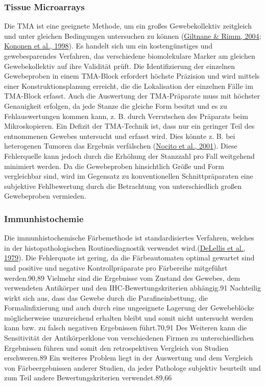 \hypertarget{tissue-microarrays}{%
\subsubsection{Tissue Microarrays}\label{tissue-microarrays}}

Die TMA ist eine geeignete Methode, um ein großes Gewebekollektiv zeitgleich und unter gleichen Bedingungen untersuchen zu können (\href{about:blank\#_ENREF_36}{Giltnane \& Rimm, 2004}; \href{about:blank\#_ENREF_46}{Kononen et al., 1998}). Es handelt sich um ein kostengünstiges und gewebesparendes Verfahren, das verschiedene biomolekulare Marker am gleichen Gewebekollektiv auf ihre Validität prüft. Die Identifizierung der einzelnen Gewebeproben in einem TMA-Block erfordert höchste Präzision und wird mittels einer Konstruktionsplanung erreicht, die die Lokalisation der einzelnen Fälle im TMA-Block erfasst. Auch die Auswertung der TMA-Präparate muss mit höchster Genauigkeit erfolgen, da jede Stanze die gleiche Form besitzt und es zu Fehlauswertungen kommen kann, z. B. durch Verrutschen des Präparats beim Mikroskopieren. Ein Defizit der TMA-Technik ist, dass nur ein geringer Teil des entnommenen Gewebes untersucht und erfasst wird. Dies könnte z. B. bei heterogenen Tumoren das Ergebnis verfälschen (\href{about:blank\#_ENREF_56}{Nocito et al., 2001}). Diese Fehlerquelle kann jedoch durch die Erhöhung der Stanzzahl pro Fall weitgehend minimiert werden. Da die Gewebeproben hinsichtlich Größe und Form vergleichbar sind, wird im Gegensatz zu konventionellen Schnittpräparaten eine subjektive Fehlbewertung durch die Betrachtung von unterschiedlich großen Gewebeproben vermieden.

\hypertarget{immunhistochemie}{%
\subsubsection{Immunhistochemie}\label{immunhistochemie}}

Die immunhistochemische Färbemethode ist standardisiertes Verfahren, welches in der histopathologischen Routinediagnostik verwendet wird.(\href{about:blank\#_ENREF_29}{DeLellis et al., 1979}). Die Fehlerquote ist gering, da die Färbeautomaten optimal gewartet sind und positive und negative Kontrollpräparate pro Färbereihe mitgeführt werden.90,89 Vielmehr sind die Ergebnisse vom Zustand des Gewebes, dem verwendeten Antikörper und den IHC-Bewertungskriterien abhängig.91 Nachteilig wirkt sich aus, dass das Gewebe durch die Parafineinbettung, die Formalinfixierung und auch durch eine ungeeignete Lagerung der Gewebeblöcke möglicherweise unzureichend erhalten bleibt und somit nicht untersucht werden kann bzw. zu falsch negativen Ergebnissen führt.70,91 Des Weiteren kann die Sensitivität der Antikörperklone von verschiedenen Firmen zu unterschiedlichen Ergebnissen führen und somit den retrospektiven Vergleich von Studien erschweren.89 Ein weiteres Problem liegt in der Auswertung und dem Vergleich von Färbeergebnissen anderer Studien, da jeder Pathologe subjektiv beurteilt und zum Teil andere Bewertungskriterien verwendet.89,66


